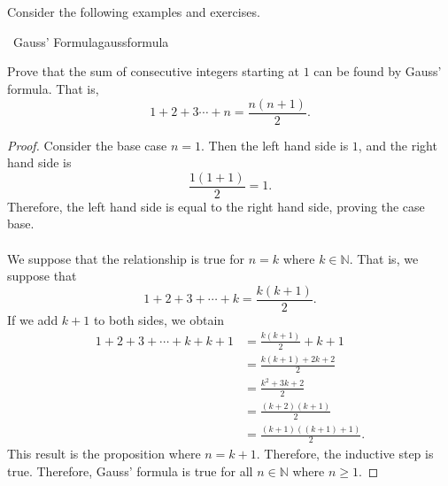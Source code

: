    \vphantom
    \\
    \\
    Consider the following examples and exercises.
    \begin{example}{\Difficulty\,\Difficulty\,\,Gauss' Formula}{gaussformula}
    
        Prove that the sum of consecutive integers starting at \(1\) can be found by Gauss' formula. That is,
        \begin{equation*}
            1+2+3\cdots+n=\frac{n(n+1)}{2}.
        \end{equation*}
        \begin{proof}
            Consider the base case \(n=1\). Then the left hand side is \(1\), and the right hand side is
            \begin{equation*}
                \frac{1(1+1)}{2}=1.
            \end{equation*}
            Therefore, the left hand side is equal to the right hand side, proving the case base.
            \\
            \\
            We suppose that the relationship is true for \(n=k\) where \(k\in\mathbb{N}\). That is, we suppose that
            \begin{equation*}
                1+2+3+\cdots+k=\frac{k(k+1)}{2}.
            \end{equation*}
            If we add \(k+1\) to both sides, we obtain
            \begin{align*}
                1+2+3+\cdots+k+k+1&=\frac{k(k+1)}{2}+k+1 \\
                &=\frac{k(k+1)+2k+2}{2} \\
                &=\frac{k^2+3k+2}{2} \\
                &=\frac{(k+2)(k+1)}{2} \\
                &=\frac{(k+1)((k+1)+1)}{2}.
            \end{align*}
            This result is the proposition where \(n=k+1\). Therefore, the inductive step is true. Therefore, Gauss' formula is true for all \(n\in\mathbb{N}\) where \(n \geq 1\).
        \end{proof}
    
    \end{example}
    \pagebreak
